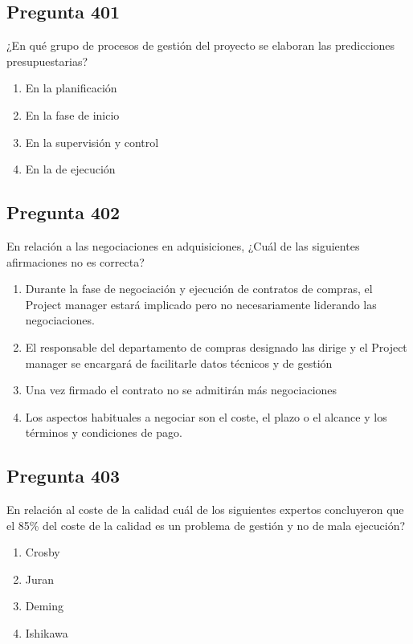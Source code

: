 \documentclass[11pt,a4paper]{article}
\begin{document}
\subsection*{Pregunta 401}
¿En qué grupo de procesos de gestión del proyecto se elaboran las predicciones presupuestarias?

\begin{enumerate}[label=\alph*)]
  \item En la planificación
  \item En la fase de inicio
  \item En la supervisión y control
  \item En la de ejecución
\end{enumerate}

\subsection*{Pregunta 402}
En relación a las negociaciones en adquisiciones, ¿Cuál de las siguientes afirmaciones no es correcta?

\begin{enumerate}[label=\alph*)]
  \item Durante la fase de negociación y ejecución de contratos de compras, el Project manager estará implicado pero no necesariamente liderando las negociaciones.
  \item El responsable del departamento de compras designado las dirige y el Project manager se encargará de facilitarle datos técnicos y de gestión
  \item Una vez firmado el contrato no se admitirán más negociaciones
  \item Los aspectos habituales a negociar son el coste, el plazo o el alcance y los términos y condiciones de pago.
\end{enumerate}

\subsection*{Pregunta 403}
En relación al coste de la calidad cuál de los siguientes expertos concluyeron que el 85\% del coste de la calidad es un problema de gestión y no de mala ejecución?

\begin{enumerate}[label=\alph*)]
  \item Crosby
  \item Juran
  \item Deming
  \item Ishikawa
\end{enumerate}
\end{document}
